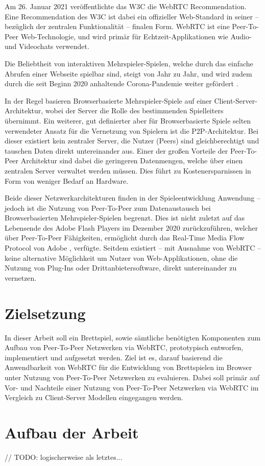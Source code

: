 Am 26. Januar 2021 veröffentlichte das \ac{W3C} die \ac{WebRTC} Recommendation. Eine Recommendation des \acs{W3C} ist dabei ein offizieller Web-Standard in seiner -- bezüglich der zentralen Funktionalität -- finalen Form. \acs{WebRTC} ist eine Peer-To-Peer Web-Technologie, und wird primär für Echtzeit-Applikationen wie Audio- und Videochats verwendet.\par

Die Beliebtheit von interaktiven Mehrspieler-Spielen, welche durch das einfache Abrufen einer Webseite spielbar sind, steigt von Jahr zu Jahr, und wird zudem durch die seit Beginn 2020 anhaltende Corona-Pandemie weiter gefördert \cite{BGMarket}.\par

In der Regel basieren Browserbasierte Mehrspieler-Spiele auf einer Client-Server-Architektur, wobei der Server die Rolle des bestimmenden Spielleiters übernimmt. Ein weiterer, gut definierter aber für Browserbasierte Spiele selten verwendeter Ansatz für die Vernetzung von Spielern ist die \acf{P2P}-Architektur. Bei dieser existiert kein zentraler Server, die Nutzer (Peers) sind gleichberechtigt und tauschen Daten direkt untereinander aus. Einer der großen Vorteile der Peer-To-Peer Architektur sind dabei die geringeren Datenmengen, welche über einen zentralen Server verwaltet werden müssen. Dies führt zu Kostenersparnissen in Form von weniger Bedarf an Hardware.\par

Beide dieser Netzwerkarchitekturen finden in der Spieleentwicklung Anwendung -- jedoch ist die Nutzung von Peer-To-Peer zum Datenaustausch bei Browserbasierten Mehrspieler-Spielen begrenzt. Dies ist nicht zuletzt auf das Lebensende des Adobe Flash Players im Dezember 2020 zurückzuführen, welcher über Peer-To-Peer Fähigkeiten, ermöglicht durch das Real-Time Media Flow Protocol von Adobe \cite{adobeRFC}, verfügte. Seitdem existiert -- mit Ausnahme von \acs{WebRTC} -- keine alternative Möglichkeit um Nutzer von Web-Applikationen, ohne die Nutzung von Plug-Ins oder Drittanbietersoftware, direkt untereinander zu vernetzen.\par

\section{Zielsetzung}
In dieser Arbeit soll ein Brettspiel, sowie sämtliche benötigten Komponenten zum Aufbau von Peer-To-Peer Netzwerken via \acs{WebRTC}, prototypisch entworfen, implementiert und aufgesetzt werden. Ziel ist es, darauf basierend die Anwendbarkeit von \acs{WebRTC} für die Entwicklung von Brettspielen im Browser unter Nutzung von Peer-To-Peer Netzwerken zu evaluieren. Dabei soll primär auf Vor- und Nachteile einer Nutzung von Peer-To-Peer Netzwerken via \acs{WebRTC} im Vergleich zu Client-Server Modellen eingegangen werden.

\section{Aufbau der Arbeit}
// TODO: logischerweise als letztes...
